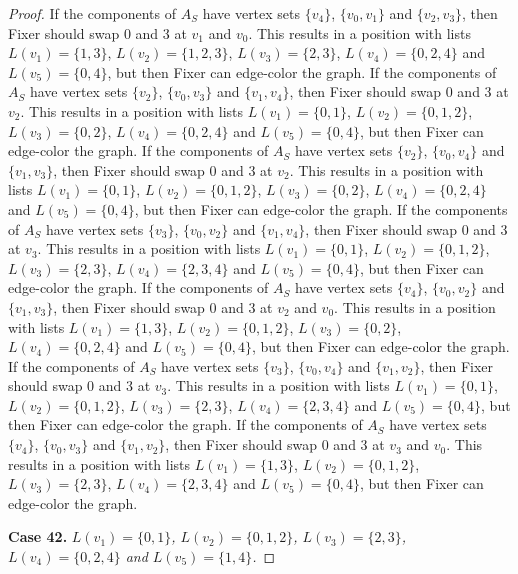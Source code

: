 \documentclass[12pt]{amsart}
\theoremstyle{plain}
\theoremstyle{definition}
\theoremstyle{remark}
\begin{document}
\begin{proof}
If the components of $A_S$ have vertex sets $\{v_4\}$, $\{v_0, v_1\}$ and $\{v_2, v_3\}$, then Fixer should swap 0 and 3 at $v_1$ and $v_0$. This results in a position with lists $L(v_1) = \{1, 3\}$, $L(v_2) = \{1, 2, 3\}$, $L(v_3) = \{2, 3\}$, $L(v_4) = \{0, 2, 4\}$ and $L(v_5) = \{0, 4\}$, but then Fixer can edge-color the graph.
If the components of $A_S$ have vertex sets $\{v_2\}$, $\{v_0, v_3\}$ and $\{v_1, v_4\}$, then Fixer should swap 0 and 3 at $v_2$. This results in a position with lists $L(v_1) = \{0, 1\}$, $L(v_2) = \{0, 1, 2\}$, $L(v_3) = \{0, 2\}$, $L(v_4) = \{0, 2, 4\}$ and $L(v_5) = \{0, 4\}$, but then Fixer can edge-color the graph.
If the components of $A_S$ have vertex sets $\{v_2\}$, $\{v_0, v_4\}$ and $\{v_1, v_3\}$, then Fixer should swap 0 and 3 at $v_2$. This results in a position with lists $L(v_1) = \{0, 1\}$, $L(v_2) = \{0, 1, 2\}$, $L(v_3) = \{0, 2\}$, $L(v_4) = \{0, 2, 4\}$ and $L(v_5) = \{0, 4\}$, but then Fixer can edge-color the graph.
If the components of $A_S$ have vertex sets $\{v_3\}$, $\{v_0, v_2\}$ and $\{v_1, v_4\}$, then Fixer should swap 0 and 3 at $v_3$. This results in a position with lists $L(v_1) = \{0, 1\}$, $L(v_2) = \{0, 1, 2\}$, $L(v_3) = \{2, 3\}$, $L(v_4) = \{2, 3, 4\}$ and $L(v_5) = \{0, 4\}$, but then Fixer can edge-color the graph.
If the components of $A_S$ have vertex sets $\{v_4\}$, $\{v_0, v_2\}$ and $\{v_1, v_3\}$, then Fixer should swap 0 and 3 at $v_2$ and $v_0$. This results in a position with lists $L(v_1) = \{1, 3\}$, $L(v_2) = \{0, 1, 2\}$, $L(v_3) = \{0, 2\}$, $L(v_4) = \{0, 2, 4\}$ and $L(v_5) = \{0, 4\}$, but then Fixer can edge-color the graph.
If the components of $A_S$ have vertex sets $\{v_3\}$, $\{v_0, v_4\}$ and $\{v_1, v_2\}$, then Fixer should swap 0 and 3 at $v_3$. This results in a position with lists $L(v_1) = \{0, 1\}$, $L(v_2) = \{0, 1, 2\}$, $L(v_3) = \{2, 3\}$, $L(v_4) = \{2, 3, 4\}$ and $L(v_5) = \{0, 4\}$, but then Fixer can edge-color the graph.
If the components of $A_S$ have vertex sets $\{v_4\}$, $\{v_0, v_3\}$ and $\{v_1, v_2\}$, then Fixer should swap 0 and 3 at $v_3$ and $v_0$. This results in a position with lists $L(v_1) = \{1, 3\}$, $L(v_2) = \{0, 1, 2\}$, $L(v_3) = \{2, 3\}$, $L(v_4) = \{2, 3, 4\}$ and $L(v_5) = \{0, 4\}$, but then Fixer can edge-color the graph.

\noindent\textbf{Case 42.  }\textit{$L(v_1) = \{0, 1\}$, $L(v_2) = \{0, 1, 2\}$, $L(v_3) = \{2, 3\}$, $L(v_4) = \{0, 2, 4\}$ and $L(v_5) = \{1, 4\}$.}


\end{proof}
\end{document}

